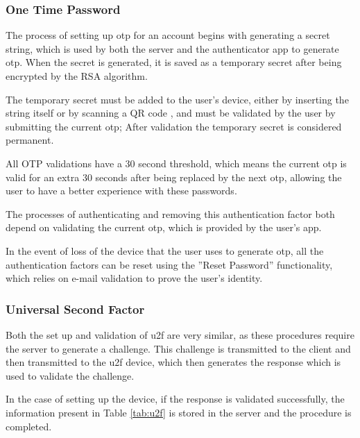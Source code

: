 \subsubsection*{One Time Password}

The process of setting up \acrshort{otp} for an account begins with generating a secret string, which is used by both the server and the authenticator app to generate \acrshort{otp}. When the secret is generated, it is saved as a temporary secret after being encrypted by the RSA algorithm.

The temporary secret must be added to the user's device, either by inserting the string itself or by scanning a QR code \cite{qr}, and must be validated by the user by submitting the current \acrshort{otp}; After validation the temporary secret is considered permanent.

All OTP validations have a 30 second threshold, which means the current \acrshort{otp} is valid for an extra 30 seconds after being replaced by the next \acrshort{otp}, allowing the user to have a better experience with these passwords.

The processes of authenticating and removing this authentication factor both depend on validating the current \acrshort{otp}, which is provided by the user's app.

In the event of loss of the device that the user uses to generate \acrshort{otp}, all the authentication factors can be reset using the ''Reset Password'' functionality, which relies on e-mail validation to prove the user's identity.

\subsubsection*{Universal Second Factor}

Both the set up and validation of \acrshort{u2f} are very similar, as these procedures require the server to generate a challenge.
This challenge is transmitted to the client and then transmitted to the \acrshort{u2f} device, which then generates the response which is used to validate the challenge.

In the case of setting up the device, if the response is validated successfully, the information present in Table \ref{tab:u2f} is stored in the server and the procedure is completed.

